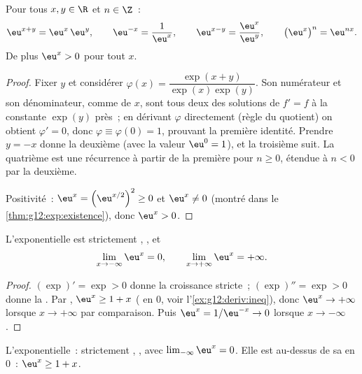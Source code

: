 \begin{proposition}\label{prop:g12:exp:funceq}
Pour tous $x, y \in \R$ et $n \in \Z$~:
\[
\eu^{x+y} = \eu^x\,\eu^y, \qquad
\eu^{-x} = \frac{1}{\eu^x}, \qquad
\eu^{x-y} = \frac{\eu^x}{\eu^y}, \qquad
\bigl(\eu^{x}\bigr)^n = \eu^{nx}.
\]
De plus $\eu^x > 0$ pour tout $x$.
\end{proposition}

\begin{proof}
Fixer $y$ et considérer $\varphi(x) = \dfrac{\exp(x+y)}{\exp(x)\exp(y)}$.
Son numérateur et son dénominateur, comme  de $x$, sont tous deux
des solutions de $f' = f$ à la constante $\exp(y)$ près~; en dérivant
$\varphi$ directement (règle du quotient) on obtient $\varphi' = 0$, donc
$\varphi \equiv \varphi(0) = 1$, prouvant la première identité. Prendre
$y = -x$ donne la deuxième (avec la valeur $\eu^0 = 1$), et la troisième
suit. La quatrième est une récurrence à partir de la première pour
$n \geq 0$, étendue à $n < 0$ par la deuxième.

Positivité~: $\eu^x = \left(\eu^{x/2}\right)^2 \geq 0$ et $\eu^x \neq 0$
(montré dans le \cref{thm:g12:exp:existence}), donc $\eu^x > 0$.
\end{proof}

\begin{proposition}\label{prop:g12:exp:variations}
L'exponentielle est strictement , , et
\[
\lim_{x\to-\infty} \eu^x = 0, \qquad
\lim_{x\to+\infty} \eu^x = +\infty .
\]
\end{proposition}

\begin{proof}
$(\exp)' = \exp > 0$ donne la croissance stricte~; $(\exp)'' = \exp > 0$
donne la . Par , $\eu^x \geq 1 + x$ ( en $0$,
voir l'\cref{ex:g12:deriv:ineq}), donc $\eu^x \to +\infty$ lorsque
$x \to +\infty$ par comparaison. Puis $\eu^{x} = 1/\eu^{-x} \to 0$
lorsque $x \to -\infty$.
\end{proof}

\begin{omfigure}

{\small L'exponentielle~: strictement , , avec
$\lim_{-\infty} \eu^x = 0$. Elle est au-dessus de sa  en $0$~:
$\eu^x \geq 1 + x$.}
\end{omfigure}

